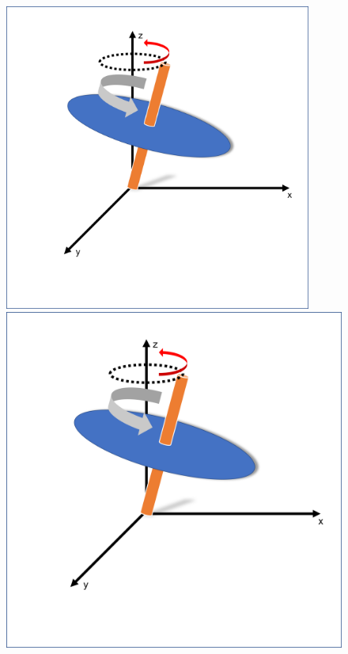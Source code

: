 \documentclass[10pt]{beamer}
\begin{document}
\begin{frame}
\begin{figure}
	\begin{minipage}{0.49\textwidth}
		\centering
		\includegraphics[width=0.9\textwidth]{sphere1.png}
	\end{minipage}
	\begin{minipage}{0.49\textwidth}
		\centering
		\includegraphics[width=1.0\textwidth]{sphere1.png}
	\end{minipage}


\end{figure}
\end{frame}
\end{document}
